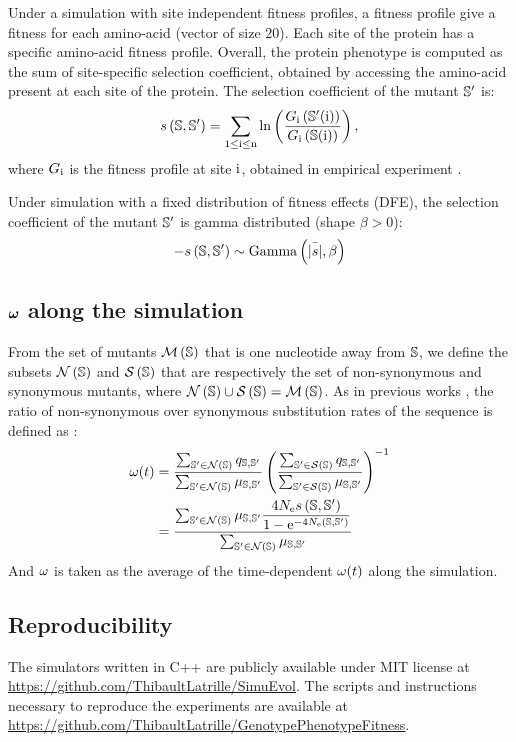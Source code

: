 \documentclass{article}
\begin{document}
Under a simulation with site independent fitness profiles, a fitness profile give a fitness for each amino-acid (vector of size $20$).
Each site of the protein has a specific amino-acid fitness profile.
Overall, the protein phenotype is computed as the sum of site-specific selection coefficient, obtained by accessing the amino-acid present at each site of the protein.
The selection coefficient of the mutant $\mathbb{S}'$ is:
\begin{equation}
s \left( \mathbb{S},\mathbb{S}'\right) = \sum_{1 \leq \text{i} \leq \text{n}} \ln \left( \dfrac{G_{\text{i}} \left(\mathbb{S}'(\text{i}) \right)}{G_{\text{i}} \left(\mathbb{S}(\text{i}) \right)} \right) ,
\end{equation}
where $G_{\text{i}}$ is the fitness profile at site $\text{i}$, obtained in empirical experiment \cite{Bloom2017}.


Under simulation with a fixed distribution of fitness effects (DFE), the selection coefficient of the mutant $\mathbb{S}'$ is gamma distributed (shape $\beta > 0$):
\begin{equation}
- s \left( \mathbb{S},\mathbb{S}'\right) \sim \text{Gamma} \left( \bar{|s|}, \beta \right)
\end{equation}
\subsection*{$\bm{\omega}$ along the simulation}
From the set of mutants $\mathcal{M}\left(\mathbb{S}\right)$ that is one nucleotide away from $\mathbb{S}$, we define the subsets $\mathcal{N}\left(\mathbb{S}\right)$ and $\mathcal{S}\left(\mathbb{S}\right)$ that are respectively the set of non-synonymous and synonymous mutants, where $\mathcal{N}\left(\mathbb{S}\right) \cup \mathcal{S}\left(\mathbb{S}\right) = \mathcal{M}\left(\mathbb{S}\right)$.
As in previous works \cite{Spielman2015a, DosReis2015, Jones2016}, the ratio of non-synonymous over synonymous substitution rates of the sequence is defined as :
\begin{align}
\omega(t) &= \dfrac{\sum_{\mathbb{S}' \in \mathcal{N}\left(\mathbb{S}\right)} q_{\mathbb{S}, \mathbb{S}'}}{\sum_{\mathbb{S}' \in \mathcal{N}\left(\mathbb{S}\right)} \mu_{\mathbb{S}, \mathbb{S}'}} \left( \dfrac{\sum_{\mathbb{S}' \in \mathcal{S}\left(\mathbb{S}\right)} q_{\mathbb{S}, \mathbb{S}'}}{\sum_{\mathbb{S}' \in \mathcal{S}\left(\mathbb{S}\right)} \mu_{\mathbb{S}, \mathbb{S}'}} \right)^{-1}\\
 &= \dfrac{\sum_{\mathbb{S}' \in \mathcal{N}\left(\mathbb{S}\right)} \mu_{\mathbb{S}, \mathbb{S}'} \dfrac{4 N_{\mathrm{e}} s \left( \mathbb{S},\mathbb{S}'\right)}{{1 - \mathrm{e}^{-4 N_{\mathrm{e}} \left( \mathbb{S},\mathbb{S}'\right)} }}}{\sum_{\mathbb{S}' \in \mathcal{N}\left(\mathbb{S}\right)} \mu_{\mathbb{S}, \mathbb{S}'}} 
\end{align}
And $\omega$ is taken as the average of the time-dependent $\omega(t)$ along the simulation.
\subsection*{Reproducibility}
The simulators written in C++ are publicly available under MIT license at \url{https://github.com/ThibaultLatrille/SimuEvol}.
The scripts and instructions necessary to reproduce the experiments are available at \url{https://github.com/ThibaultLatrille/GenotypePhenotypeFitness}.


\end{document}
